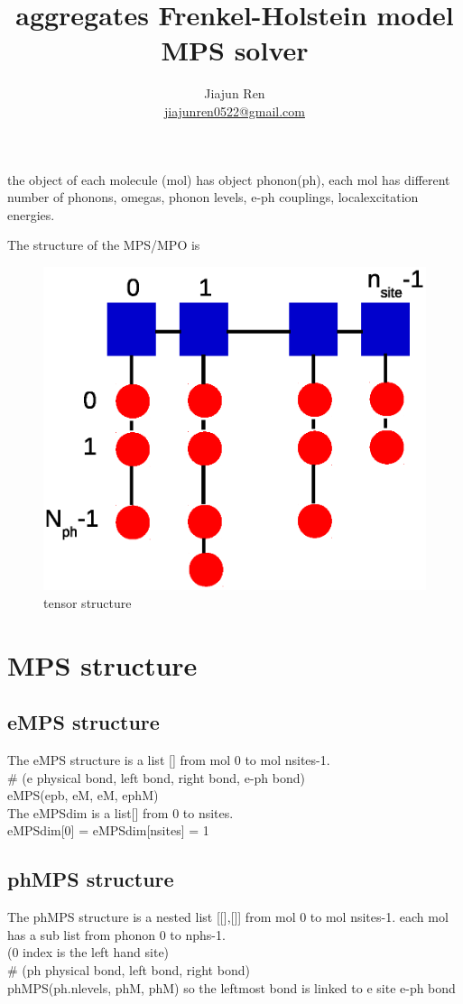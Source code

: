\documentclass[a4paper,11pt]{ctexart}
\author{Jiajun Ren \\
\href{mailto:jiajunren0522@gmail.com}{jiajunren0522@gmail.com}}
\title{aggregates Frenkel-Holstein model MPS solver}
\begin{document}
\maketitle
the object of each molecule (mol) has object phonon(ph), each mol has different
number of phonons, omegas, phonon levels, e-ph couplings, localexcitation
energies.

The structure of the MPS/MPO is 
\begin{figure}[htbp]
    \includegraphics[width = \columnwidth]{structure.eps}  
    \caption{\label{fig:structure} tensor structure }
\end{figure}

\section{MPS structure}
\subsection{eMPS structure}
The eMPS structure is a list [] from mol 0 to mol nsites-1. \\
\# (e physical bond, left bond, right bond, e-ph bond) \\
eMPS(epb, eM, eM, ephM) \\

The eMPSdim is a list[] from 0 to nsites. \\
eMPSdim[0] = eMPSdim[nsites] = 1

\subsection{phMPS structure}
The phMPS structure is a nested list [[],[]] from mol 0 to mol nsites-1. each mol has a
sub list from phonon 0 to nphs-1.\\ (0 index is the left hand site) \\
\# (ph physical bond, left bond, right bond) \\
phMPS(ph.nlevels, phM, phM)
so the leftmost bond is linked to e site e-ph bond
\end{document}
